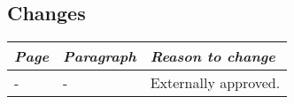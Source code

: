 \subsection*{Changes}
\begin{tabular}{lll}
    \toprule
    \emph{Page} & \emph{Paragraph} & \emph{Reason to change} \\
    \midrule
    - & - & Externally approved.\\
    \bottomrule
\end{tabular}